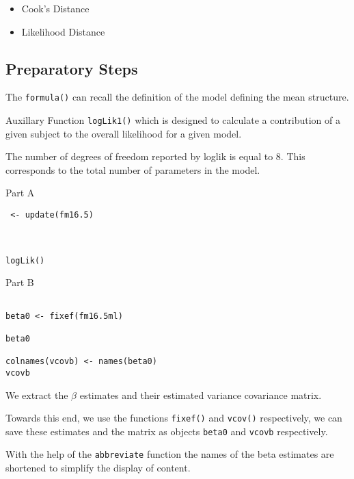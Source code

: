 \documentclass[a4paper,12pt]{article}
\begin{document}
\begin{itemize}
\item Cook's Distance
\item Likelihood Distance
\end{itemize}

\subsection{Preparatory Steps}

The \texttt{formula()} can recall the definition of the model defining the mean structure.

Auxillary Function \texttt{logLik1()} which is designed to calculate a contribution of a given subject to the overall likelihood for a given model.


The number of degrees of freedom reported by loglik is equal to 8. This corresponds
to the total number of parameters in the model.

Part A
\begin{framed}
\begin{verbatim}
 <- update(fm16.5)


  
logLik()
\end{verbatim}
\end{framed}


Part B

\begin{framed}
\begin{verbatim}

beta0 <- fixef(fm16.5ml)

beta0

colnames(vcovb) <- names(beta0)
vcovb

\end{verbatim}
\end{framed}

We extract the \textbf{$\beta$} estimates and their estimated variance covariance matrix.

Towards this end, we use the functions \texttt{fixef()} and \texttt{vcov()} respectively, we can save these estimates and the matrix as objects \texttt{beta0} and 
\texttt{vcovb} respectively.

With the help of the \texttt{abbreviate} function the names of the beta estimates are shortened to simplify the display of content.
\end{document}
